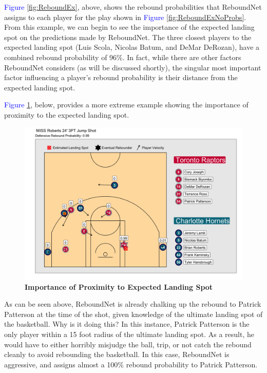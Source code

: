 \documentclass{article}
\begin{document}
\noindent
\textcolor{blue}{Figure} \ref{fig:ReboundEx}, above, shows the rebound probabilities that ReboundNet assigns to each player for the play shown in \textcolor{blue}{Figure} \ref{fig:ReboundExNoProbs}. From this example, we can begin to see the importance of the expected landing spot on the predictions made by ReboundNet. The three closest players to the expected landing spot (Luis Scola, Nicolas Batum, and DeMar DeRozan), have a combined rebound probability of 96\%. In fact, while there are other factors ReboundNet considers (as will be discussed shortly), the singular most important factor influencing a player's rebound probability is their distance from the expected landing spot. 

\bigbreak
\noindent
\textcolor{blue}{Figure} \ref{fig:LandingEx}, below, provides a more extreme example showing the importance of proximity to the expected landing spot.

\begin{figure}[htb]
\centering
\includegraphics[width=1\columnwidth]{LandingEx}
\caption{\bf{Importance of Proximity to Expected Landing Spot}}
\label{fig:LandingEx}
\end{figure}

\bigbreak
\noindent
As can be seen above, ReboundNet is already chalking up the rebound to Patrick Patterson at the time of the shot, given knowledge of the ultimate landing spot of the basketball. Why is it doing this? In this instance, Patrick Patterson is the only player within a 15 foot radius of the ultimate landing spot. As a result, he would have to either horribly misjudge the ball, trip, or not catch the rebound cleanly to avoid rebounding the basketball. In this case, ReboundNet is aggressive, and assigns almost a 100\% rebound probability to Patrick Patterson. 
\end{document}

